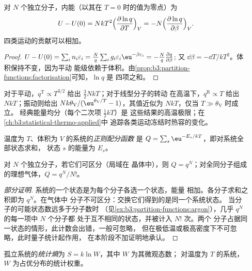 \begin{theorem}[内能]\label{thm:b3:partition-functions:internal-energy}
对 $N$ 个独立分子，内能（以其在
$T = 0$ 时的值为零点）为
\[
  U - U(0) = NkT^2\Bigl(\frac{\partial\ln q}{\partial T}\Bigr)_V
          = -N\Bigl(\frac{\partial\ln q}{\partial\beta}\Bigr)_V .
\]
四类运动的贡献可以相加。
\end{theorem}

\begin{proof}
$U - U(0) = \sum_in_i\varepsilon_i = \frac Nq\sum_ig_i\varepsilon_i\eu^{-\beta\varepsilon_i} = -\frac Nq\frac{\partial q}{\partial\beta}$;
又 $\dd\beta = -\dd T/kT^2$。体积保持不变，因为平动
能级依赖于体积。由\cref{prop:b3:partition-functions:factorisation}可知，$\ln q$ 是
四项之和。
\end{proof}

对于平动，$q^{\mathrm T} \propto T^{3/2}$ 给出 $\frac32NkT$；对于线型分子的转动
在高温下，$q^{\mathrm R} \propto T$ 给出 $NkT$；振动则给出
$Nk\theta_{\mathrm V}/(\eu^{\theta_{\mathrm V}/T} - 1)$，其值近似为 $NkT$，仅当 $T \gg \theta_{\mathrm V}$ 时成立。
经典能量均分（每个二次项 $\frac12kT$）是
这些结果的高温极限；在\cref{ch:b3:statistical-thermo-applied}中
追踪各类运动冻结时热容的变化。

\begin{definition}[正则配分函数]\label{def:b3:partition-functions:canonical}
温度为 $T$、体积为 $V$ 的系统的\emph{正则配分函数}
是 $Q = \sum_s\eu^{-E_s/kT}$，即对系统全部状态求和，
状态 $s$ 的能量为 $E_s$。
\end{definition}

\begin{proposition}[理想气体的正则配分函数]\label{prop:b3:partition-functions:canonical}
对 $N$ 个独立分子，若它们可区分（局域在
晶体中），则 $Q = q^N$；对全同分子组成的理想气体，$Q = q^N/N!$。
\end{proposition}

\begin{proof}[部分证明]
系统的一个状态是为每个分子各选一个状态，能量
相加。各分子求和之积即为 $q^N$。在气体中
分子不可区分：交换它们得到的是同一个系统状态。
当分子的可能状态数远多于分子数时
（见\cref{ex:b3:partition-functions:argon}），几乎 $q^N$ 的每一项中 $N$ 个分子都
处于互不相同的状态，并被计入 $N!$ 次。两个
分子占据同一状态的情形，此计数会出错，一般可忽略，
但在极低温或极高密度下不可忽略，此时量子统计起作用，
在本阶段不加证明地承认。
\end{proof}

\begin{definition}[统计熵]\label{def:b3:partition-functions:statistical-entropy}
孤立系统的\emph{统计熵}为
$S = k\ln W$，其中 $W$ 为其微观态数；
对温度为 $T$ 的系统，$W$ 为占优分布的统计权重。
\end{definition}

